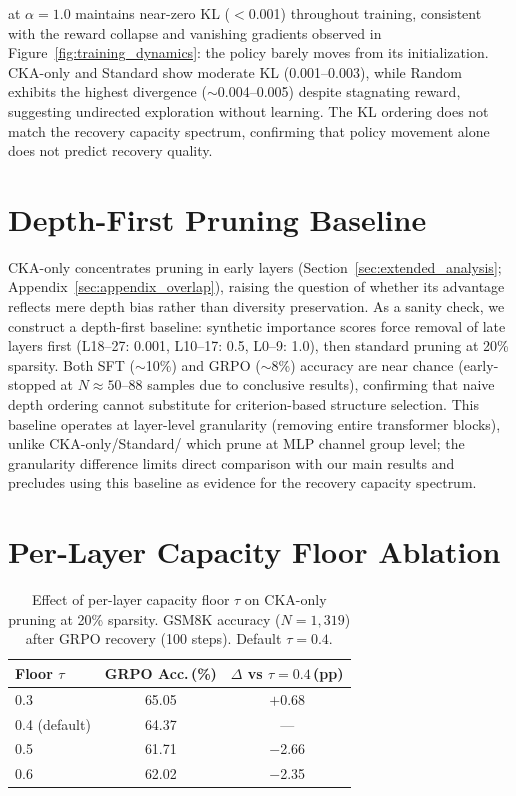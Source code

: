 \rasp{} at $\alpha{=}1.0$ maintains near-zero KL ($<$0.001) throughout training, consistent with the reward collapse and vanishing gradients observed in Figure~\ref{fig:training_dynamics}: the policy barely moves from its initialization.
CKA-only and Standard show moderate KL (0.001--0.003), while Random exhibits the highest divergence (${\sim}$0.004--0.005) despite stagnating reward, suggesting undirected exploration without learning.
The KL ordering does not match the recovery capacity spectrum, confirming that policy movement alone does not predict recovery quality.

\section{Depth-First Pruning Baseline}
\label{sec:appendix_depth_first}

CKA-only concentrates pruning in early layers (Section~\ref{sec:extended_analysis}; Appendix~\ref{sec:appendix_overlap}), raising the question of whether its advantage reflects mere depth bias rather than diversity preservation.
As a sanity check, we construct a depth-first baseline: synthetic importance scores force removal of late layers first (L18--27: 0.001, L10--17: 0.5, L0--9: 1.0), then standard pruning at 20\% sparsity.
Both SFT (${\sim}$10\%) and GRPO (${\sim}$8\%) accuracy are near chance (early-stopped at $N{\approx}50$--88 samples due to conclusive results), confirming that naive depth ordering cannot substitute for criterion-based structure selection.
This baseline operates at layer-level granularity (removing entire transformer blocks), unlike CKA-only/Standard/\rasp{} which prune at MLP channel group level; the granularity difference limits direct comparison with our main results and precludes using this baseline as evidence for the recovery capacity spectrum.

\section{Per-Layer Capacity Floor Ablation}
\label{sec:appendix_floor}

\begin{table}[h]
\centering
\small
\caption{Effect of per-layer capacity floor $\tau$ on CKA-only pruning at 20\% sparsity. GSM8K accuracy ($N{=}1{,}319$) after GRPO recovery (100 steps). Default $\tau{=}0.4$.}
\label{tab:floor_ablation}
\begin{tabular}{@{}lcc@{}}
\toprule
Floor $\tau$ & GRPO Acc.\,(\%) & $\Delta$ vs $\tau{=}0.4$\,(pp) \\
\midrule
0.3 & 65.05 & $+$0.68 \\
0.4 (default) & 64.37 & --- \\
0.5 & 61.71 & $-$2.66 \\
0.6 & 62.02 & $-$2.35 \\
\bottomrule
\end{tabular}
\end{table}

